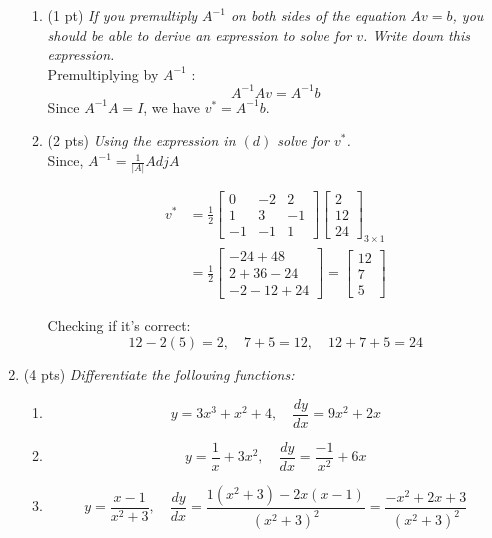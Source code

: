 \documentclass{./../../../Latex/tests}
\begin{document}
\begin{enumerate}
\begin{enumerate}
  \item (1 pt) \textit{If you premultiply $A^{-1}$ on both sides of the equation $ Av=b $, you should be able to derive an expression to solve for $v$. Write down this expression. } \\

  Premultiplying by $A^{-1}$ :
$$
A^{-1} A v=A^{-1} b 
$$
Since $A^{-1} A=I$, we have  $v^*=A^{-1} b$. \\


  
  \item (2 pts) \textit{Using the expression in $(d)$ solve for $v^*$. } \\

Since, $A^{-1}=\frac{1}{|A|} A d j A$

$$
\begin{aligned}
v^{*} &=\frac{1}{2}\left[\begin{array}{rrr}
0 & -2 & 2 \\
1 & 3 & -1 \\
-1 & -1 & 1
\end{array}\right]\left[\begin{array}{c}
2 \\
12 \\
24
\end{array}\right]_{3 \times 1} \\
&=\frac{1}{2}\left[\begin{array}{c}
-24+48 \\
2+36-24 \\
-2-12+24
\end{array}\right]=\left[\begin{array}{c}
12 \\
7 \\
5
\end{array}\right]
\end{aligned}
$$

Checking if it's correct:
$$
12-2(5)=2, \quad  7+5=12, \quad 12+7+5=24
$$
\end{enumerate}

\item (4 pts) \textit{Differentiate the following functions:}
\begin{enumerate}
\item $$ y = 3x^3+x^2+4, \quad \frac{d y}{d x}=9 x^{2}+2 x $$
  \item $$ y= \frac{1}{x}+3x^2, \quad \frac{d y}{d x}=\frac{-1}{x^{2}}+6 x$$
  \item $$y=\frac{x-1}{x^2+3}, \quad \frac{d y}{d x}= \frac{1\left(x^{2}+3\right)-2 x(x-1)}{\left(x^{2}+3\right)^{2}} =\frac{-x^{2}+2 x+3}{\left(x^{2}+3\right)^{2}}$$
\end{enumerate}



\end{enumerate}
\end{document}
